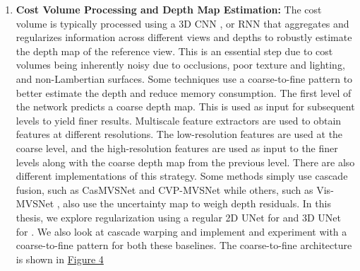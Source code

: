 \begin{enumerate}
\item \textbf{Cost Volume Processing and Depth Map Estimation:} The cost volume is typically processed using a 3D CNN \cite{Yao2018, Zhang2020, Gu2020, Yang2020}, or RNN \cite{Yao2019} that aggregates and regularizes information across different views and depths to robustly estimate the depth map of the reference view. This is an essential step due to cost volumes being inherently noisy due to occlusions, poor texture and lighting, and non-Lambertian surfaces. Some techniques use a coarse-to-fine pattern to better estimate the depth and reduce memory consumption. The first level of the network predicts a coarse depth map. This is used as input for subsequent levels to yield finer results. Multiscale feature extractors are used to obtain features at different resolutions. The low-resolution features are used at the coarse level, and the high-resolution features are used as input to the finer levels along with the coarse depth map from the previous level. There are also different implementations of this strategy. Some methods simply use cascade fusion, such as CasMVSNet and CVP-MVSNet\cite{Gu2020, Yang2020} while others, such as Vis-MVSNet \cite{Zhang2020}, also use the uncertainty map to weigh depth residuals. In this thesis, we explore regularization using a regular 2D UNet for {\rmvd} and 3D UNet for {\mvsn}. We also look at cascade warping and implement and experiment with a coarse-to-fine pattern for both these baselines. The coarse-to-fine architecture is shown in \hyperref[fig:ctf]{Figure 4}


\end{enumerate}
